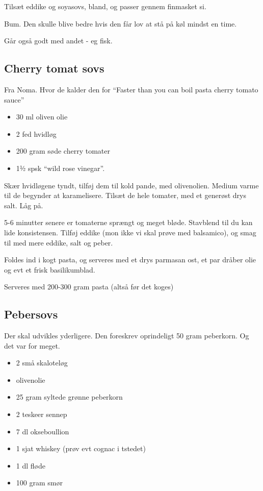 \documentclass[
]{book}
\providecommand{\tightlist}{%
  \setlength{\itemsep}{0pt}\setlength{\parskip}{0pt}}
\begin{document}
Tilsæt eddike og soyasovs, bland, og passer gennem finmasket si.

Bum. Den skulle blive bedre hvis den får lov at stå på køl mindst en time.

Går også godt med andet - eg fisk.

\hypertarget{cherry-tomat-sovs}{%
\subsection{Cherry tomat sovs}\label{cherry-tomat-sovs}}

Fra Noma. Hvor de kalder den for ``Faster than you can boil pasta cherry tomato sauce''

\begin{itemize}
\tightlist
\item
  30 ml oliven olie
\item
  2 fed hvidløg
\item
  200 gram søde cherry tomater
\item
  1½ spsk ``wild rose vinegar''.
\end{itemize}

Skær hvidløgene tyndt, tilføj dem til kold pande, med olivenolien.
Medium varme til de begynder at karamelisere.
Tilsæt de hele tomater, med et generøst drys salt. Låg på.

5-6 minutter senere er tomaterne sprængt og meget bløde. Stavblend til du kan lide konsistensen. Tilføj
eddike (mon ikke vi skal prøve med balsamico), og smag til med mere eddike, salt og peber.

Foldes ind i kogt pasta, og serveres med et drys parmasan ost, et par dråber olie og evt et frisk basilikumblad.

Serveres med 200-300 gram pasta (altså før det koges)

\hypertarget{pebersovs}{%
\subsection{Pebersovs}\label{pebersovs}}

Der skal udvikles yderligere.
Den foreskrev oprindeligt 50 gram peberkorn. Og det var for meget.

\begin{itemize}
\tightlist
\item
  2 små skaloteløg
\item
  olivenolie
\item
  25 gram syltede grønne peberkorn
\item
  2 teskeer sennep
\item
  7 dl okseboullion
\item
  1 sjat whiskey (prøv evt cognac i tstedet)
\item
  1 dl fløde
\item
  100 gram smør
\end{itemize}
\end{document}
